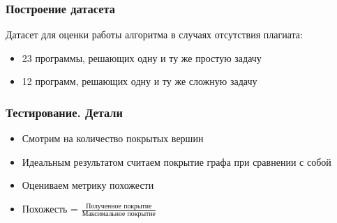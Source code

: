 \documentclass[10pt]{beamer}
\begin{document}
\begin{frame}\frametitle{Построение датасета}
	Датасет для оценки работы алгоритма в случаях отсутствия плагиата:
	\begin{itemize}
		\item 23 программы, решающих одну и ту же простую задачу
		\item 12 программ, решающих одну и ту же сложную задачу
	\end{itemize}
	
\end{frame}

\begin{frame}\frametitle{Тестирование. Детали}
	\begin{itemize}
		\item Смотрим на количество покрытых вершин
		\item Идеальным результатом считаем покрытие графа при сравнении с собой
		\item Оцениваем метрику похожести
		\item Похожесть = $\frac{\text{Полученное покрытие}}{\text{Максимальное покрытие}}$
	\end{itemize}
    
\end{frame}
\end{document}

